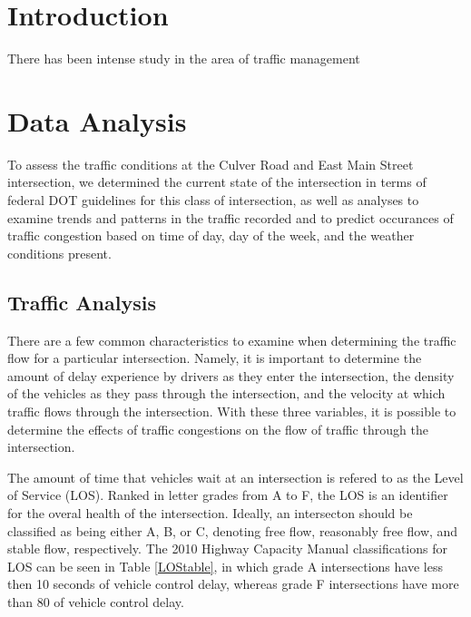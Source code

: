 \documentclass{report}
\begin{document}



\noindent
\section*{Introduction}


There has been intense study in the area of traffic management

\noindent
\section*{Data Analysis}

To assess the traffic conditions at the Culver Road and East Main Street
intersection, we determined the current state of the intersection in terms of
federal DOT guidelines for this class of intersection, as well as analyses to
examine trends and patterns in the traffic recorded and to predict occurances of
traffic congestion based on time of day, day of the week, and the weather
conditions present.


\subsection*{Traffic Analysis}

There are a few common characteristics to examine when determining the traffic
flow for a particular intersection. Namely, it is important to determine the
amount of delay experience by drivers as they enter the intersection, the density
of the vehicles as they pass through the intersection, and the velocity at which
traffic flows through the intersection. With these three variables, it is possible
to determine the effects of traffic congestions on the flow of traffic through
the intersection.

The amount of time that vehicles wait at an intersection is refered to as the
Level of Service (LOS). Ranked in letter grades from A to F, the LOS is an
identifier for the overal health of the intersection. Ideally, an intersecton
should be classified as being either A, B, or C, denoting free flow, reasonably
free flow, and stable flow, respectively. The 2010 Highway Capacity
Manual classifications for LOS can be seen in Table \ref{LOStable}, in which grade
A intersections have less then 10 seconds of vehicle control delay, whereas grade
F intersections have more than 80 of vehicle control delay.
\end{document}
